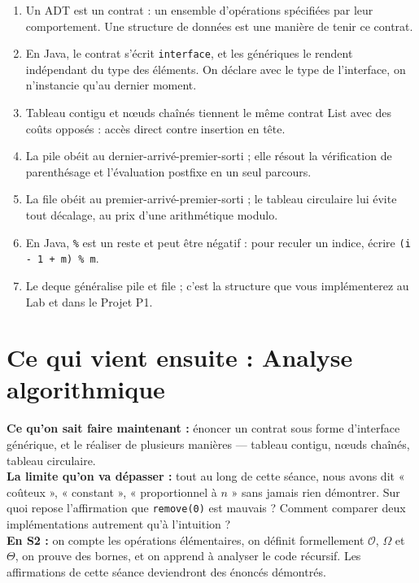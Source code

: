 \documentclass[11pt,a4paper]{article}
\newcommand{\bigO}{\mathcal{O}}
\newcommand{\bigOmega}{\Omega}
\newcommand{\bigTheta}{\Theta}
\theoremstyle{definition}
\theoremstyle{remark}
\begin{document}
\begin{retenirbox}
\begin{enumerate}[nosep]
    \item Un ADT est un contrat : un ensemble d'opérations spécifiées par
          leur comportement. Une structure de données est une manière de
          tenir ce contrat.
    \item En Java, le contrat s'écrit \texttt{interface}, et les génériques
          le rendent indépendant du type des éléments. On déclare avec le
          type de l'interface, on n'instancie qu'au dernier moment.
    \item Tableau contigu et nœuds chaînés tiennent le même contrat List avec
          des coûts opposés : accès direct contre insertion en tête.
    \item La pile obéit au dernier-arrivé-premier-sorti ; elle résout la
          vérification de parenthésage et l'évaluation postfixe en un seul
          parcours.
    \item La file obéit au premier-arrivé-premier-sorti ; le tableau
          circulaire lui évite tout décalage, au prix d'une arithmétique
          modulo.
    \item En Java, \texttt{\%} est un reste et peut être négatif : pour
          reculer un indice, écrire \texttt{(i - 1 + m) \% m}.
    \item Le deque généralise pile et file ; c'est la structure que vous
          implémenterez au Lab et dans le Projet P1.
\end{enumerate}
\end{retenirbox}

\section*{Ce qui vient ensuite : Analyse algorithmique}

\begin{prereqbox}
\textbf{Ce qu'on sait faire maintenant :} énoncer un contrat sous forme
d'interface générique, et le réaliser de plusieurs manières --- tableau
contigu, nœuds chaînés, tableau circulaire.\\[4pt]
\textbf{La limite qu'on va dépasser :} tout au long de cette séance, nous
avons dit « coûteux », « constant », « proportionnel à $n$ » sans jamais rien
démontrer. Sur quoi repose l'affirmation que \texttt{remove(0)} est mauvais ?
Comment comparer deux implémentations autrement qu'à l'intuition ?\\[4pt]
\textbf{En S2 :} on compte les opérations élémentaires, on définit
formellement $\bigO$, $\bigOmega$ et $\bigTheta$, on prouve des bornes, et on
apprend à analyser le code récursif. Les affirmations de cette séance
deviendront des énoncés démontrés.
\end{prereqbox}
\end{document}
